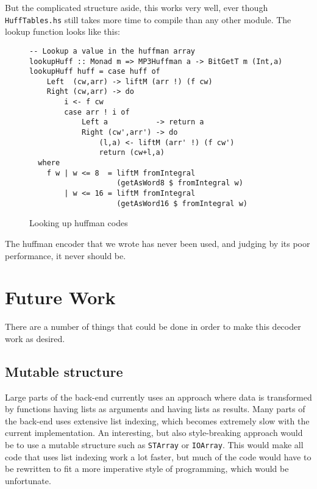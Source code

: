 \documentclass[a4paper,12pt]{article}
\begin{document}
        But the complicated structure aside, this works very well, ever though
        \texttt{HuffTables.hs} still takes more time to compile than any other
        module.  The lookup function looks like this:
\begin{figure}[H]
  \begin{center}
        \begin{lstlisting}
-- Lookup a value in the huffman array
lookupHuff :: Monad m => MP3Huffman a -> BitGetT m (Int,a)
lookupHuff huff = case huff of
    Left  (cw,arr) -> liftM (arr !) (f cw)
    Right (cw,arr) -> do
        i <- f cw
        case arr ! i of
            Left a           -> return a
            Right (cw',arr') -> do
                (l,a) <- liftM (arr' !) (f cw')
                return (cw+l,a)
  where
    f w | w <= 8  = liftM fromIntegral
                    (getAsWord8 $ fromIntegral w)
        | w <= 16 = liftM fromIntegral
                    (getAsWord16 $ fromIntegral w)
        \end{lstlisting}
    \caption{Looking up huffman codes}\label{fig:lookuphuff}
  \end{center}
\end{figure}

        The huffman encoder that we wrote has never been used, and judging by
        its poor performance, it never should be.

\section{Future Work}
    There are a number of things that could be done in order to make this
    decoder work as desired.

    \subsection{Mutable structure}
        Large parts of the back-end currently uses an approach where data is
        transformed by functions having lists as arguments and having lists as
        results. Many parts of the back-end uses extensive list indexing, which
        becomes extremely slow with the current implementation. An interesting,
        but also style-breaking approach would be to use a mutable structure
        such as \texttt{STArray} or \texttt{IOArray}. This would make all code
        that uses list indexing work a lot faster, but much of the code would
        have to be rewritten to fit a more imperative style of programming,
        which would be unfortunate.
\end{document}
